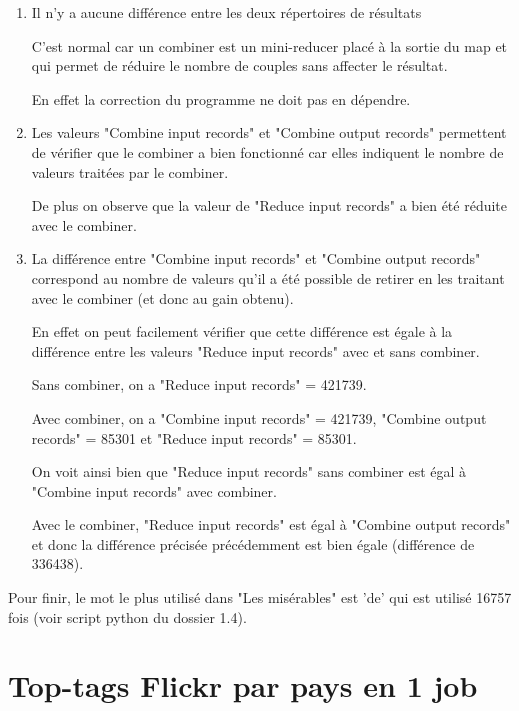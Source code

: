 \documentclass[a4paper, 11pt, titlepage]{article}
\begin{document}
\begin{enumerate}

\item

Il n'y a aucune différence entre les deux répertoires de résultats

C'est normal car un combiner est un mini-reducer placé à la sortie du map et qui permet de réduire le nombre de couples sans affecter le résultat.

En effet la correction du programme ne doit pas en dépendre.

\item
Les valeurs "Combine input records" et "Combine output records" permettent de vérifier que le combiner a bien fonctionné car elles indiquent le nombre de valeurs traitées par le combiner.

De plus on observe que la valeur de "Reduce input records" a bien été réduite avec le combiner.

\item
La différence entre "Combine input records" et "Combine output records" correspond au nombre de valeurs qu'il a été possible de retirer en les traitant avec le combiner (et donc au gain obtenu).

En effet on peut facilement vérifier que cette différence est égale à la différence entre les valeurs "Reduce input records" avec et sans combiner.

Sans combiner, on a "Reduce input records" = 421739.

Avec combiner, on a "Combine input records" = 421739, "Combine output records" = 85301 et "Reduce input records" = 85301.

On voit ainsi bien que "Reduce input records" sans combiner est égal à "Combine input records" avec combiner.

Avec le combiner, "Reduce input records" est égal à "Combine output records" et donc la différence précisée précédemment est bien égale (différence de 336438).

\end{enumerate}


Pour finir, le mot le plus utilisé dans "Les misérables" est 'de' qui est utilisé 16757 fois (voir script python du dossier 1.4).



\section {Top-tags Flickr par pays en 1 job}
\end{document}

